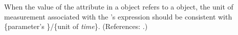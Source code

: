 When the value of the attribute  in a \RateRule object
refers to a \Parameter object, the unit of measurement associated with
the \RateRule's  expression should be consistent with
\{parameter's \}/\{unit of \emph{time}\}. (References: .)
